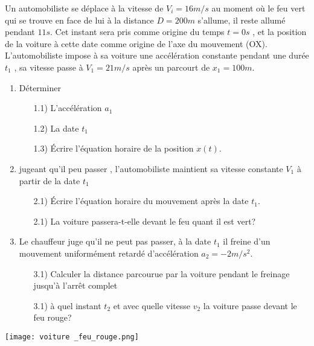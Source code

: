 \documentclass[10pt,a4paper]{article}
\begin{document}
\begin{tcolorbox}[sabour,title=EXERCICE 6]
Un automobiliste se déplace à la vitesse de $V_i = 16m/s$  au moment où le feu vert qui se trouve en face de lui à la distance $D=200m$ s'allume, il reste allumé pendant $11s$. Cet instant sera pris comme origine du temps $t=0s$ , et la position de la voiture à cette date comme origine de l'axe  du mouvement (OX).
L'automobiliste impose à sa voiture une accélération constante  pendant une durée $t_1$ ,  sa vitesse passe à  $V_1=21m/s$ après un parcourt de $x_1=100m$.

\begin{enumerate}
\item Déterminer 
\begin{enumerate}
\item[1.1)] L'accélération $a_1$ 
\item[1.2)] La date $t_1$ 
\item[1.3)] Écrire l'équation horaire de la position $x(t)$.
\end{enumerate}
\item jugeant qu'il peu passer , l'automobiliste maintient sa vitesse constante $V_1$ à partir de la date $t_1$
\begin{enumerate}
\item[2.1)] Écrire l'équation horaire du mouvement après la date $t_1$.
\item[2.1)] La voiture passera-t-elle devant le feu quant il est vert?
\end{enumerate}
\item Le chauffeur  juge qu'il ne peut pas passer, à la date $t_1$ il freine d'un mouvement uniformément retardé d'accélération $a_2 =-2m/s^2$.
\begin{enumerate}


\item[3.1)] Calculer la distance parcourue par la voiture pendant le freinage jusqu'à l'arrêt complet
\item[3.1)] à quel instant $t_2$ et avec quelle vitesse $v_2$ la voiture passe devant le feu rouge?
\end{enumerate}
\end{enumerate}

\texttt{[image: voiture \_feu\_rouge.png]} 



\end{tcolorbox}
\end{document}
